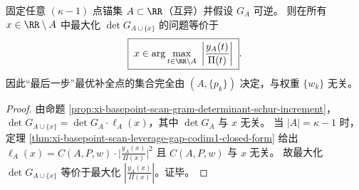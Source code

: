\begin{corollary}\label{cor:xi-basepoint-scan-doptimal-last-step-weight-free}
固定任意 \((\kappa-1)\) 点锚集 \(A\subset\RR\)（互异）并假设 \(G_A\) 可逆。
则在所有 \(x\in\RR\setminus A\) 中最大化 \(\det G_{A\cup\{x\}}\) 的问题等价于
\[
\boxed{\;
x\in\arg\max_{t\in\RR\setminus A}\ \left|\frac{y_A(t)}{\Pi(t)}\right|\; }.
\]
因此“最后一步”最优补全点的集合完全由 \((A,\{p_k\})\) 决定，与权重 \(\{w_k\}\) 无关。
\end{corollary}
\begin{proof}
由命题 \ref{prop:xi-basepoint-scan-gram-determinant-schur-increment}，
\(
\det G_{A\cup\{x\}}=\det G_A\cdot \ell_A(x)
\)，其中 \(\det G_A\) 与 \(x\) 无关。
当 \(|A|=\kappa-1\) 时，定理 \ref{thm:xi-basepoint-scan-leverage-gap-codim1-closed-form} 给出
\(
\ell_A(x)=C(A,P,w)\cdot\bigl|\frac{y_A(x)}{\Pi(x)}\bigr|^2
\)
且 \(C(A,P,w)\) 与 \(x\) 无关。
故最大化 \(\det G_{A\cup\{x\}}\) 等价于最大化 \(\left|\frac{y_A(x)}{\Pi(x)}\right|\)。证毕。
\end{proof}

